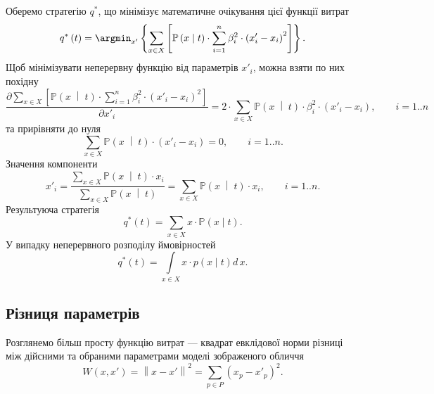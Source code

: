 Оберемо стратегію $q^*$,
що мінімізує математичне очікування цієї функції витрат
\begin{equation*}
  q^* \left( t \right)
  = \argmin_{x'} \left\{
    \sum\limits_{x \in X} \left[
        \mathbb{P} \left( x \;\middle|\;  t \right)
        \cdot \sum_{i = 1}^n \beta_i^2 \cdot \left( x'_i - x_i \right)^2
      \right]
    \right\}.
\end{equation*}
Щоб мінімізувати неперервну функцію від параметрів $x'_i$,
можна взяти по них похідну
\begin{equation*}
  \frac{\partial \sum\limits_{x \in X} \left[
      \mathbb{P} \left( x \;\middle|\;  t \right)
      \cdot \sum\limits_{i = 1}^n \beta_i^2 \cdot \left( x'_i - x_i \right)^2
  \right]}{\partial x'_i}
  = 2 \cdot \sum_{x \in X} \mathbb{P} \left( x \;\middle|\;  t \right)
    \cdot \beta_i^2 \cdot \left( x'_i - x_i \right), \qquad i = 1..n
\end{equation*}
та прирівняти до нуля
\begin{equation*}
  \sum_{x \in X} \mathbb{P} \left( x \;\middle|\;  t \right)
  \cdot \left( x'_i - x_i \right) = 0, \qquad i = 1..n.
\end{equation*}
Значення компоненти
\begin{equation*}
  x'_i = \frac{\sum\limits_{x \in X}
    \mathbb{P} \left( x \;\middle|\;  t \right) \cdot x_i}
    {\sum\limits_{x \in X}
      \mathbb{P} \left( x \;\middle|\;  t \right)}
  = \sum\limits_{x \in X}
    \mathbb{P} \left( x \;\middle|\;  t \right) \cdot x_i, \qquad i = 1..n.
\end{equation*}
Результуюча стратегія
\begin{equation*}
  q^*\left( t \right)
  = \sum_{x \in X} x \cdot \mathbb{P}\left( x \mid t \right).
\end{equation*}
У випадку неперервного розподілу ймовірностей
\begin{equation*}
  q^*\left( t \right)
  = \int\limits_{x \in X} x \cdot p\left( x \mid t \right) d\,x.
\end{equation*}

\subsection{Різниця параметрів}

Розглянемо більш просту функцію витрат ---
квадрат евклідової норми різниці між дійсними та обраними параметрами
моделі зображеного обличчя
\begin{equation*}
  W \left( x, x' \right)
  = \left\| x - x' \right\|^2
  = \sum_{p \in P} \left( x_p - x'_p \right)^2.
\end{equation*}

